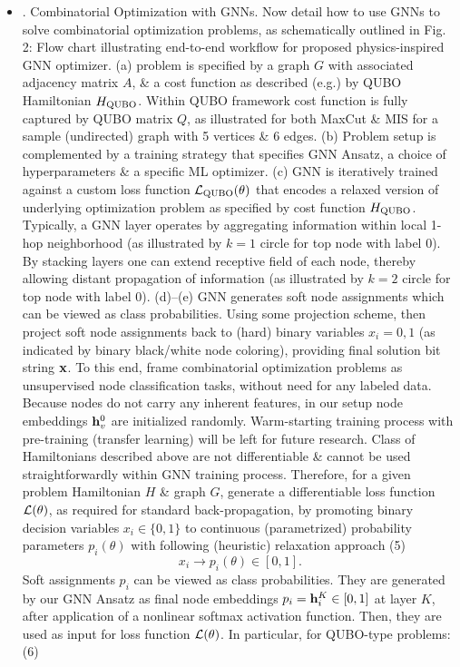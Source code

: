 \documentclass{article}
\begin{document}
\begin{itemize}
    \item {. Combinatorial Optimization with GNNs.} Now detail how to use GNNs to solve combinatorial optimization problems, as schematically outlined in {\sf Fig. 2: Flow chart illustrating end-to-end workflow for proposed physics-inspired GNN optimizer. (a) problem is specified by a graph $G$ with associated adjacency matrix $A$, \& a cost function as described (e.g.) by QUBO Hamiltonian $H_{\rm QUBO}$. Within QUBO framework cost function is fully captured by QUBO matrix $Q$, as illustrated for both MaxCut \& MIS for a sample (undirected) graph with 5 vertices \& 6 edges. (b) Problem setup is complemented by a training strategy that specifies GNN Ansatz, a choice of hyperparameters \& a specific ML optimizer. (c) GNN is iteratively trained against a custom loss function ${\cal L}_{\rm QUBO}(\theta)$ that encodes a relaxed version of underlying optimization problem as specified by cost function $H_{\rm QUBO}$. Typically, a GNN layer operates by aggregating information within local 1-hop neighborhood (as illustrated by $k = 1$ circle for top node with label 0). By stacking layers one can extend receptive field of each node, thereby allowing distant propagation of information (as illustrated by $k = 2$ circle for top node with label 0). (d)--(e) GNN generates soft node assignments which can be viewed as class probabilities. Using some projection scheme, then project soft node assignments back to (hard) binary variables $x_i = 0,1$ (as indicated by binary black/white node coloring), providing final solution bit string ${\bf x}$.} To this end, frame combinatorial optimization problems as unsupervised node classification tasks, without need for any labeled data. Because nodes do not carry any inherent features, in our setup node embeddings ${\bf h}_v^0$ are initialized randomly. Warm-starting training process with pre-training (transfer learning) will be left for future research. Class of Hamiltonians described above are not differentiable \& cannot be used straightforwardly within GNN training process. Therefore, for a given problem Hamiltonian $H$ \& graph $G$, generate a differentiable loss function ${\cal L}(\theta)$, as required for standard back-propagation, by promoting binary decision variables $x_i\in\{0,1\}$ to continuous (parametrized) probability parameters $p_i(\theta)$ with following (heuristic) relaxation approach (5)
    \begin{equation*}
        x_i\to p_i(\theta)\in[0,1].
    \end{equation*}
    Soft assignments $p_i$ can be viewed as class probabilities. They are generated by our GNN Ansatz as final node embeddings $p_i = {\bf h}_i^K\in[0,1]$ at layer $K$, after application of a nonlinear softmax activation function. Then, they are used as input for loss function ${\cal L}(\theta)$. In particular, for QUBO-type problems: (6)

\end{itemize}
\end{document}
